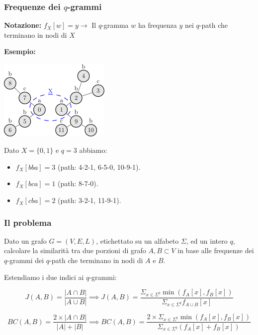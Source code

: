 \begin{frame}
	\frametitle{Frequenze dei $q$-grammi}
	
	\textbf{Notazione:}  
	\small \center	
	$f_X[w] = y \rightarrow$ Il $q$-gramma $w$ ha frequenza $y$ nei $q$-path che terminano in nodi di $X$\medskip
	
	\pause
	
	\textbf{Esempio:}  
	
	\includegraphics[width=0.4\textwidth]{images/12_freq}
		
	Dato $X = \{0, 1\}$ e $q=3$ abbiamo:
	\centering
	\begin{itemize}
		\item $f_X[bba] = 3$ (path: 4-2-1, 6-5-0, 10-9-1).
		\item $f_X[bca] = 1$ (path: 8-7-0).
		\item $f_X[cba] = 2$ (path: 3-2-1, 11-9-1).
	\end{itemize}
\end{frame}

\begin{frame}
	\frametitle{Il problema}
	
	\begin{flushleft}
		Dato un grafo $G=(V,E,L)$, etichettato su un alfabeto $\Sigma$, ed un intero $q$,
		calcolare la similarità tra due porzioni di grafo $A, B \subset V$ in base alle frequenze
		dei $q$-grammi dei $q$-path che terminano in nodi di $A$ e $B$.
	\end{flushleft}

	\pause
			
	Estendiamo i due indici ai $q$-grammi:

	\begin{equation*}\label{jaccard-sub}	
		J(A,B) = \frac{|A \cap B|}{|A \cup B|} \implies J(A,B) = \frac{ \Sigma_{x \in \Sigma^{q}} \min(f_{A}[x], f_{B}[x]) }{ \Sigma_{x \in \Sigma^{q}} f_{A \cup B}[x] }
	\end{equation*}

	\begin{equation*}\label{bray-sub}
		BC(A,B) = \frac{2 \times |A \cap B|}{|A| + |B|} \implies BC(A,B) = \frac{ 2 \times \Sigma_{x \in \Sigma^{q}} \min(f_{A}[x], f_{B}[x]) }{ \Sigma_{x \in \Sigma^{q}} (f_{A}[x] + f_{B}[x]) }
	\end{equation*}
	
\end{frame}


